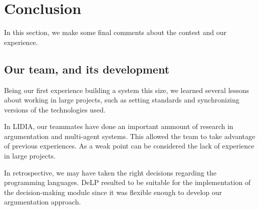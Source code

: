 \documentclass{llncs2e/llncs}
\begin{document}
    

\section{Conclusion}


    In this section, we make some final comments about the contest and our experience.

\subsection{Our team, and its development}

    Being our first experience building a system this size, we learned several
    lessons about working in large projects, such as setting standards and
    synchronizing versions of the technologies used.

    In LIDIA, our teammates have done an important ammount of research in argumentation
    and multi-agent systems. This allowed the team to take advantage of previous experiences. 
    As a weak point can be considered the lack of experience in large projects.

    In retrospective, we may have taken the right decisions regarding the programming languages. 
    DeLP resulted to be suitable for the implementation of the decision-making module since
    it was flexible enough to develop our argumentation approach.
\end{document}
